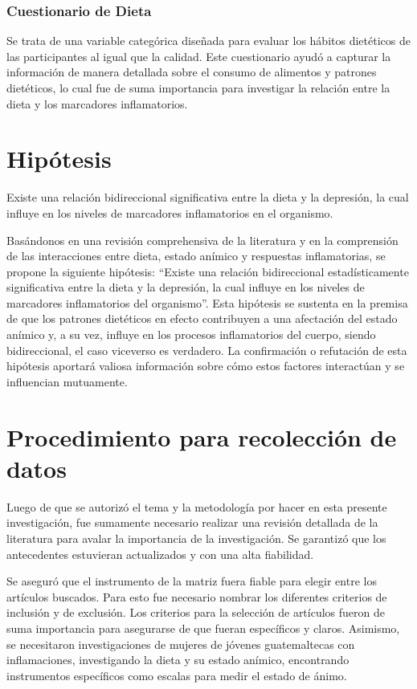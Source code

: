 \documentclass[man]{apa7}
\begin{document}
	\subsubsection{Cuestionario de Dieta}
	Se trata de una variable categórica diseñada para evaluar los hábitos dietéticos de las participantes al igual que la calidad. Este cuestionario ayudó a capturar la información de manera detallada sobre el consumo de alimentos y patrones dietéticos, lo cual fue de suma importancia para investigar la relación entre la dieta y los marcadores inflamatorios.



	\section{Hipótesis}\label{hipuxf3tesis}

	Existe una relación bidireccional significativa entre la dieta y la
	depresión, la cual influye en los niveles de marcadores inflamatorios en
	el organismo.

	Basándonos en una revisión comprehensiva de la literatura y en la
	comprensión de las interacciones entre dieta, estado anímico y
	respuestas inflamatorias, se propone la siguiente hipótesis: ``Existe una
	relación bidireccional estadísticamente significativa entre la dieta y
	la depresión, la cual influye en los niveles de marcadores inflamatorios
	del organismo''. Esta hipótesis se sustenta en la premisa de que los
	patrones dietéticos en efecto contribuyen a una afectación del estado
	anímico y, a su vez, influye en los procesos inflamatorios del cuerpo,
	siendo bidireccional, el caso viceverso es verdadero. La confirmación o
	refutación de esta hipótesis aportará valiosa información sobre cómo
	estos factores interactúan y se influencian mutuamente.

	\section{Procedimiento para recolección de datos}\label{procedimiento-para-recolecciuxf3n-de-datos}

	Luego de que se autorizó el tema y la metodología por hacer en
	esta presente investigación, fue sumamente necesario realizar una
	revisión detallada de la literatura para avalar la importancia de la
	investigación. Se garantizó que los antecedentes estuvieran actualizados y
	con una alta fiabilidad.

	Se aseguró que el instrumento de la matriz fuera fiable para elegir entre los artículos buscados. Para esto fue necesario nombrar los diferentes criterios de inclusión y de exclusión. Los criterios para la selección de artículos fueron de suma importancia para asegurarse de que fueran específicos y claros. Asimismo, se necesitaron investigaciones de mujeres de jóvenes guatemaltecas con inflamaciones, investigando la dieta y su estado anímico, encontrando instrumentos específicos como escalas para medir el estado de ánimo.
\end{document}
